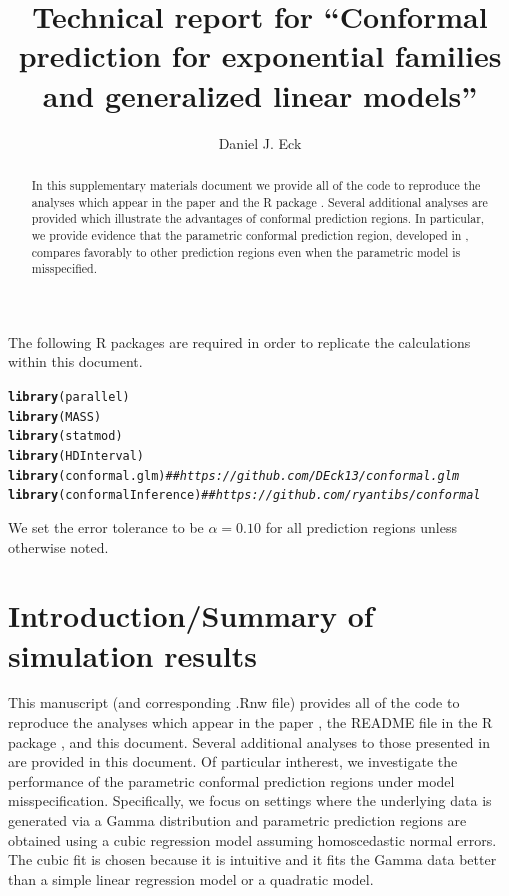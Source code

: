 \documentclass[11pt]{article}\usepackage[]{graphicx}\usepackage[]{color}
\title{Technical report for ``Conformal prediction for exponential 
  families and generalized linear models''}
\author{Daniel J. Eck}
\makeatletter
\newcommand{\hlcom}[1]{\textcolor[rgb]{0.678,0.584,0.686}{\textit{#1}}}%
\newcommand{\hlstd}[1]{\textcolor[rgb]{0.345,0.345,0.345}{#1}}%
\newcommand{\hlkwd}[1]{\textcolor[rgb]{0.737,0.353,0.396}{\textbf{#1}}}%
\newenvironment{kframe}{%
 \def\at@end@of@kframe{}%
 \ifinner\ifhmode%
  \def\at@end@of@kframe{\end{minipage}}%
  \begin{minipage}{\columnwidth}%
 \fi\fi%
 \def\FrameCommand##1{\hskip\@totalleftmargin \hskip-\fboxsep
 \colorbox{shadecolor}{##1}\hskip-\fboxsep
     \hskip-\linewidth \hskip-\@totalleftmargin \hskip\columnwidth}%
 \MakeFramed {\advance\hsize-\width
   \@totalleftmargin\z@ \linewidth\hsize
   \@setminipage}}%
 {\par\unskip\endMakeFramed%
 \at@end@of@kframe}
\newenvironment{knitrout}{}{} %
\makeatother
\begin{document}
\maketitle

\begin{abstract}
In this supplementary materials document we provide all of the code to 
reproduce the analyses which appear in the paper \citet{eck2019conformal} and 
the R package \citet{eck2018conformalR}.  Several additional analyses are 
provided which illustrate the advantages of conformal prediction regions.  In 
particular, we provide evidence that the parametric conformal prediction 
region, developed in \citet{eck2019conformal}, compares favorably to other 
prediction regions even when the parametric model is misspecified.  
\end{abstract}

\vspace*{0.5cm}

\tableofcontents

\vspace*{0.5cm}

The following R packages are required in order to replicate the calculations 
within this document. 

\begin{knitrout}
\color{fgcolor}\begin{kframe}
\begin{alltt}
\hlkwd{library}\hlstd{(parallel)}
\hlkwd{library}\hlstd{(MASS)}
\hlkwd{library}\hlstd{(statmod)}
\hlkwd{library}\hlstd{(HDInterval)}
\hlkwd{library}\hlstd{(conformal.glm)} \hlcom{## https://github.com/DEck13/conformal.glm}
\hlkwd{library}\hlstd{(conformalInference)} \hlcom{## https://github.com/ryantibs/conformal}
\end{alltt}
\end{kframe}
\end{knitrout}

We set the error tolerance to be $\alpha = 0.10$ for all prediction regions 
unless otherwise noted.


\section{Introduction/Summary of simulation results}

This manuscript (and corresponding .Rnw file) provides all of the code to 
reproduce the analyses which appear in the paper \citet{eck2019conformal}, the 
README file in the R package \citet{eck2018conformalR}, and this document.  
Several additional analyses to those presented in 
\citet{eck2019conformal} are provided in this document.  
Of particular intherest, we investigate the performance of the parametric 
conformal prediction regions under model misspecification.  
Specifically, we focus on settings where the underlying data is generated 
via a Gamma distribution and parametric prediction regions are obtained using a 
cubic regression model assuming homoscedastic normal errors.  The cubic fit is 
chosen because it is intuitive and it fits the Gamma data better than a simple 
linear regression model or a quadratic model.  
\end{document}

